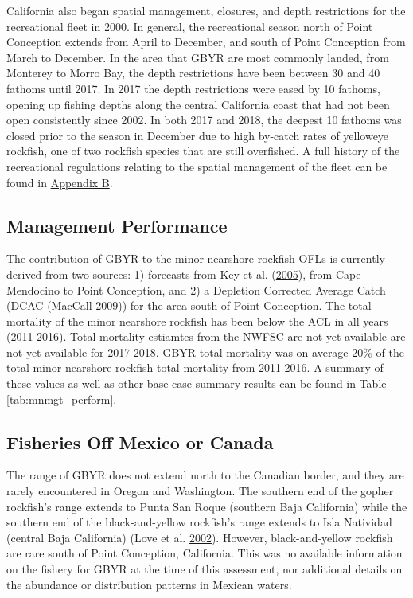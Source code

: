 \documentclass[12pt,]{article}
\begin{document}
California also began spatial management, closures, and depth
restrictions for the recreational fleet in 2000. In general, the
recreational season north of Point Conception extends from April to
December, and south of Point Conception from March to December. In the
area that GBYR are most commonly landed, from Monterey to Morro Bay, the
depth restrictions have been between 30 and 40 fathoms until 2017. In
2017 the depth restrictions were eased by 10 fathoms, opening up fishing
depths along the central California coast that had not been open
consistently since 2002. In both 2017 and 2018, the deepest 10 fathoms
was closed prior to the season in December due to high by-catch rates of
yelloweye rockfish, one of two rockfish species that are still
overfished. A full history of the recreational regulations relating to
the spatial management of the fleet can be found in
\protect\hyperlink{appendix-b.-californias-recreational-fishery-regulations}{Appendix
B}.

\subsection{Management Performance}\label{management-performance-1}

The contribution of GBYR to the minor nearshore rockfish OFLs is
currently derived from two sources: 1) forecasts from Key et al.
(\protect\hyperlink{ref-Key2005}{2005}), from Cape Mendocino to Point
Conception, and 2) a Depletion Corrected Average Catch (DCAC (MacCall
\protect\hyperlink{ref-MacCall2009}{2009})) for the area south of Point
Conception. The total mortality of the minor nearshore rockfish has been
below the ACL in all years (2011-2016). Total mortality estiamtes from
the NWFSC are not yet available are not yet available for 2017-2018.
GBYR total mortality was on average 20\% of the total minor nearshore
rockfish total mortality from 2011-2016. A summary of these values as
well as other base case summary results can be found in Table
\ref{tab:mnmgt_perform}.

\subsection{Fisheries Off Mexico or
Canada}\label{fisheries-off-mexico-or-canada}

The range of GBYR does not extend north to the Canadian border, and they
are rarely encountered in Oregon and Washington. The southern end of the
gopher rockfish's range extends to Punta San Roque (southern Baja
California) while the southern end of the black-and-yellow rockfish's
range extends to Isla Natividad (central Baja California) (Love et al.
\protect\hyperlink{ref-Love2002}{2002}). However, black-and-yellow
rockfish are rare south of Point Conception, California. This was no
available information on the fishery for GBYR at the time of this
assessment, nor additional details on the abundance or distribution
patterns in Mexican waters.
\end{document}
